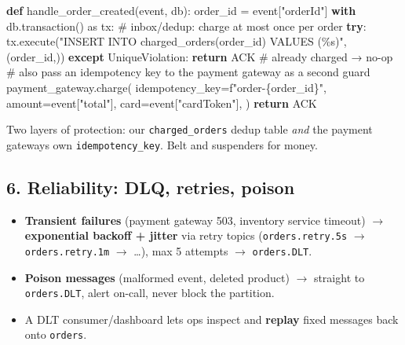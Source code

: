 \documentclass[11pt]{article}
\providecommand{\tightlist}{\setlength{\itemsep}{1pt}\setlength{\parskip}{0pt}}
\newenvironment{Shaded}{\begin{snugshade}}{\end{snugshade}}
\newcommand{\CommentTok}[1]{\textcolor[rgb]{0.48,0.49,0.49}{#1}}
\newcommand{\ControlFlowTok}[1]{\textcolor[rgb]{0.99,0.74,0.29}{\textbf{#1}}}
\newcommand{\ImportTok}[1]{\textcolor[rgb]{0.15,0.68,0.38}{#1}}
\newcommand{\KeywordTok}[1]{\textcolor[rgb]{0.81,0.81,0.76}{\textbf{#1}}}
\newcommand{\NormalTok}[1]{\textcolor[rgb]{0.81,0.81,0.76}{#1}}
\newcommand{\OperatorTok}[1]{\textcolor[rgb]{0.81,0.81,0.76}{#1}}
\newcommand{\SpecialCharTok}[1]{\textcolor[rgb]{0.24,0.68,0.91}{#1}}
\newcommand{\SpecialStringTok}[1]{\textcolor[rgb]{0.85,0.27,0.33}{#1}}
\newcommand{\StringTok}[1]{\textcolor[rgb]{0.96,0.31,0.31}{#1}}
\begin{document}
\begin{Shaded}
\begin{Highlighting}[]
\KeywordTok{def}\NormalTok{ handle\_order\_created(event, db):}
\NormalTok{    order\_id }\OperatorTok{=}\NormalTok{ event[}\StringTok{"orderId"}\NormalTok{]}
    \ControlFlowTok{with}\NormalTok{ db.transaction() }\ImportTok{as}\NormalTok{ tx:}
        \CommentTok{\# inbox/dedup: charge at most once per order}
        \ControlFlowTok{try}\NormalTok{:}
\NormalTok{            tx.execute(}\StringTok{"INSERT INTO charged\_orders(order\_id) VALUES (}\SpecialCharTok{\%s}\StringTok{)"}\NormalTok{, (order\_id,))}
        \ControlFlowTok{except}\NormalTok{ UniqueViolation:}
            \ControlFlowTok{return}\NormalTok{ ACK                      }\CommentTok{\# already charged → no{-}op}
        \CommentTok{\# also pass an idempotency key to the payment gateway as a second guard}
\NormalTok{        payment\_gateway.charge(}
\NormalTok{            idempotency\_key}\OperatorTok{=}\SpecialStringTok{f"order{-}}\SpecialCharTok{\{}\NormalTok{order\_id}\SpecialCharTok{\}}\SpecialStringTok{"}\NormalTok{,}
\NormalTok{            amount}\OperatorTok{=}\NormalTok{event[}\StringTok{"total"}\NormalTok{], card}\OperatorTok{=}\NormalTok{event[}\StringTok{"cardToken"}\NormalTok{],}
\NormalTok{        )}
    \ControlFlowTok{return}\NormalTok{ ACK}
\end{Highlighting}
\end{Shaded}

Two layers of protection: our \texttt{charged\_orders} dedup table \emph{and} the payment gateway\textquotesingle s own \texttt{idempotency\_key}. Belt and suspenders for money.

\subsection{6. Reliability: DLQ, retries, poison}\label{6-reliability-dlq-retries-poison}

\begin{itemize}
\tightlist
\item
  \textbf{Transient failures} (payment gateway 503, inventory service timeout) \(\rightarrow\) \textbf{exponential backoff + jitter} via retry topics (\texttt{orders.retry.5s} \(\rightarrow\) \texttt{orders.retry.1m} \(\rightarrow\) \ldots), max 5 attempts \(\rightarrow\) \texttt{orders.DLT}.
\item
  \textbf{Poison messages} (malformed event, deleted product) \(\rightarrow\) straight to \texttt{orders.DLT}, alert on-call, never block the partition.
\item
  A DLT consumer/dashboard lets ops inspect and \textbf{replay} fixed messages back onto \texttt{orders}.
\end{itemize}
\end{document}

